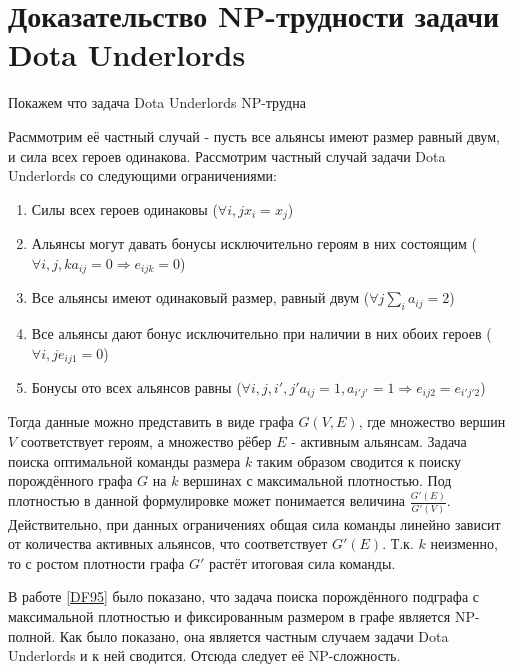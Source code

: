 \documentclass{article}
\begin{document}
\section{Доказательство NP-трудности задачи Dota Underlords}
Покажем что задача Dota Underlords NP-трудна

Расммотрим её частный случай - пусть все альянсы имеют размер равный двум, и сила всех героев одинакова. Рассмотрим частный случай задачи Dota Underlords со следующими ограничениями:

\begin{enumerate}
    \item Силы всех героев одинаковы ($\forall i, j x_i=x_j$)
    \item Альянсы могут давать бонусы исключительно героям в них состоящим ($\forall i, j, k a_{ij}=0 \Longrightarrow e_{ijk} = 0$)
    \item Все альянсы имеют одинаковый размер, равный двум ($\forall j \sum_i a_{ij}=2$)
    \item Все альянсы дают бонус исключительно при наличии в них обоих героев ($\forall i, j e_{ij1}=0$)
    \item Бонусы ото всех альянсов равны ($\forall i, j, i', j' a_{ij}=1, a_{i' j'}=1 \Longrightarrow e_{ij2}=e_{i' j' 2}$)
\end{enumerate}

Тогда данные можно представить в виде графа $G(V, E)$, где множество вершин $V$ соответствует героям, а множество рёбер $E$ - активным альянсам. Задача поиска оптимальной команды размера $k$ таким образом сводится к поиску порождённого графа $G$ на $k$ вершинах с максимальной плотностью. Под плотностью в данной формулировке может понимается величина $\frac{G'(E)}{G'(V)}$. Действительно, при данных ограничениях общая сила команды линейно зависит от количества активных альянсов, что соответствует $G'(E)$. Т.к. $k$ неизменно, то с ростом плотности графа $G'$ растёт итоговая сила команды.

В работе \ref{DF95} было показано, что задача поиска порождённого подграфа с максимальной плотностью и фиксированным размером в графе является NP-полной. Как было показано, она является частным случаем задачи Dota Underlords и к ней сводится. Отсюда следует её NP-сложность.




 


\begin{thebibliography}{1}



\end{thebibliography}
\end{document}
